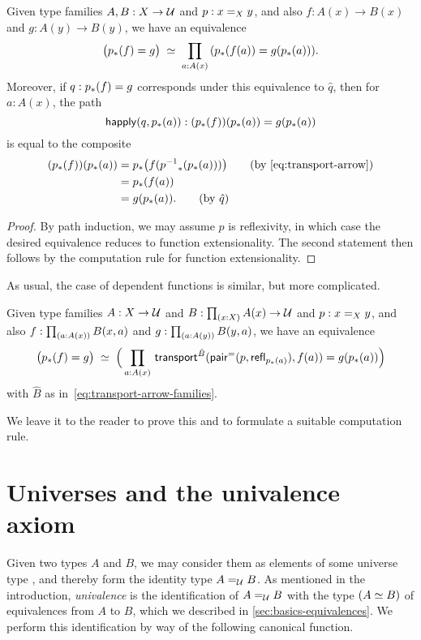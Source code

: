 \begin{lem}\label{thm:dpath-arrow}
  Given type families $A,B:X\to\type$ and $p:\id[X]xy$, and also $f:A(x)\to B(x)$ and $g:A(y)\to B(y)$, we have an equivalence
  \[ \eqvspaced{ \big(\trans{p}{f} = {g}\big) } { \prd{a:A(x)}  (\trans{p}{f(a)} = g(\trans{p}{a})) }. \]
  Moreover, if $q:\trans{p}{f} = {g}$ corresponds under this equivalence to $\hat q$, then for $a:A(x)$, the path
  \[ \happly(q,\trans p a) : (\trans p f)(\trans p a) = g(\trans p a)\]
  is equal to the composite
  \begin{align*}
    (\trans p f)(\trans p a)
    &= \trans p {f (\trans {\opp p}{\trans p a})}
    \tag{by~\eqref{eq:transport-arrow}}\\
    &= \trans p {f(a)}\\
    &= g(\trans p a).
    \tag{by $\hat{q}$}
  \end{align*}
\end{lem}
\begin{proof}
  By path induction, we may assume $p$ is reflexivity, in which case the desired equivalence reduces to function extensionality.
  The second statement then follows by the computation rule for function extensionality.
\end{proof}

As usual, the case of dependent functions is similar, but more complicated.

\begin{lem}\label{thm:dpath-forall}
  Given type families $A:X\to\type$ and $B:\prd{x:X} A(x)\to\type$ and $p:\id[X]xy$, and also $f:\prd{a:A(x)} B(x,a)$ and $g:\prd{a:A(y)} B(y,a)$, we have an equivalence
  \[ \eqvspaced{ \big(\trans{p}{f} = {g}\big) } { \Big(\prd{a:A(x)}  \transfib{\hat{B}}{\pairpath(p,\refl{\trans pa})}{f(a)} = g(\trans{p}{a}) \Big) } \]
  with $\hat{B}$ as in~\eqref{eq:transport-arrow-families}.
\end{lem}

We leave it to the reader to prove this and to formulate a suitable computation rule.


\section{Universes and the univalence axiom}
\label{sec:compute-universe}

Given two types $A$ and $B$, we may consider them as elements of some universe type \type, and thereby form the identity type $\id[\type]AB$.
As mentioned in the introduction, \emph{univalence} is the identification of $\id[\type]AB$ with the type $(\eqv AB)$ of equivalences from $A$ to $B$, which we described in \autoref{sec:basics-equivalences}.
We perform this identification by way of the following canonical function.

